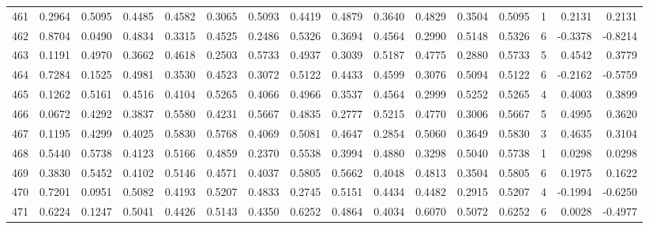 \begin{tabular}{lrrrrrrrrrrrrrrr}
461 &      0.2964 &  0.5095 &  0.4485 &  0.4582 &  0.3065 &  0.5093 &  0.4419 &  0.4879 &  0.3640 &  0.4829 &   0.3504 &     0.5095 &      1 &                    0.2131 &                     0.2131 \\
462 &      0.8704 &  0.0490 &  0.4834 &  0.3315 &  0.4525 &  0.2486 &  0.5326 &  0.3694 &  0.4564 &  0.2990 &   0.5148 &     0.5326 &      6 &                   -0.3378 &                    -0.8214 \\
463 &      0.1191 &  0.4970 &  0.3662 &  0.4618 &  0.2503 &  0.5733 &  0.4937 &  0.3039 &  0.5187 &  0.4775 &   0.2880 &     0.5733 &      5 &                    0.4542 &                     0.3779 \\
464 &      0.7284 &  0.1525 &  0.4981 &  0.3530 &  0.4523 &  0.3072 &  0.5122 &  0.4433 &  0.4599 &  0.3076 &   0.5094 &     0.5122 &      6 &                   -0.2162 &                    -0.5759 \\
465 &      0.1262 &  0.5161 &  0.4516 &  0.4104 &  0.5265 &  0.4066 &  0.4966 &  0.3537 &  0.4564 &  0.2999 &   0.5252 &     0.5265 &      4 &                    0.4003 &                     0.3899 \\
466 &      0.0672 &  0.4292 &  0.3837 &  0.5580 &  0.4231 &  0.5667 &  0.4835 &  0.2777 &  0.5215 &  0.4770 &   0.3006 &     0.5667 &      5 &                    0.4995 &                     0.3620 \\
467 &      0.1195 &  0.4299 &  0.4025 &  0.5830 &  0.5768 &  0.4069 &  0.5081 &  0.4647 &  0.2854 &  0.5060 &   0.3649 &     0.5830 &      3 &                    0.4635 &                     0.3104 \\
468 &      0.5440 &  0.5738 &  0.4123 &  0.5166 &  0.4859 &  0.2370 &  0.5538 &  0.3994 &  0.4880 &  0.3298 &   0.5040 &     0.5738 &      1 &                    0.0298 &                     0.0298 \\
469 &      0.3830 &  0.5452 &  0.4102 &  0.5146 &  0.4571 &  0.4037 &  0.5805 &  0.5662 &  0.4048 &  0.4813 &   0.3504 &     0.5805 &      6 &                    0.1975 &                     0.1622 \\
470 &      0.7201 &  0.0951 &  0.5082 &  0.4193 &  0.5207 &  0.4833 &  0.2745 &  0.5151 &  0.4434 &  0.4482 &   0.2915 &     0.5207 &      4 &                   -0.1994 &                    -0.6250 \\
471 &      0.6224 &  0.1247 &  0.5041 &  0.4426 &  0.5143 &  0.4350 &  0.6252 &  0.4864 &  0.4034 &  0.6070 &   0.5072 &     0.6252 &      6 &                    0.0028 &                    -0.4977 \\

\end{tabular}
